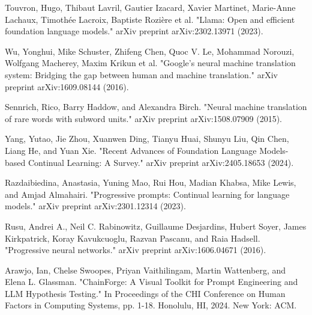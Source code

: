 \documentclass[runningheads]{llncs}
\begin{document}
\begin{thebibliography}{8}
Touvron, Hugo, Thibaut Lavril, Gautier Izacard, Xavier Martinet, Marie-Anne Lachaux, Timothée Lacroix, Baptiste Rozière et al. "Llama: Open and efficient foundation language models." arXiv preprint arXiv:2302.13971 (2023).

Wu, Yonghui, Mike Schuster, Zhifeng Chen, Quoc V. Le, Mohammad Norouzi, Wolfgang Macherey, Maxim Krikun et al. "Google's neural machine translation system: Bridging the gap between human and machine translation." arXiv preprint arXiv:1609.08144 (2016).

Sennrich, Rico, Barry Haddow, and Alexandra Birch. "Neural machine translation of rare words with subword units." arXiv preprint arXiv:1508.07909 (2015).

Yang, Yutao, Jie Zhou, Xuanwen Ding, Tianyu Huai, Shunyu Liu, Qin Chen, Liang He, and Yuan Xie. "Recent Advances of Foundation Language Models-based Continual Learning: A Survey." arXiv preprint arXiv:2405.18653 (2024).

Razdaibiedina, Anastasia, Yuning Mao, Rui Hou, Madian Khabsa, Mike Lewis, and Amjad Almahairi. "Progressive prompts: Continual learning for language models." arXiv preprint arXiv:2301.12314 (2023).


Rusu, Andrei A., Neil C. Rabinowitz, Guillaume Desjardins, Hubert Soyer, James Kirkpatrick, Koray Kavukcuoglu, Razvan Pascanu, and Raia Hadsell. "Progressive neural networks." arXiv preprint arXiv:1606.04671 (2016).

Arawjo, Ian, Chelse Swoopes, Priyan Vaithilingam, Martin Wattenberg, and Elena L. Glassman. "ChainForge: A Visual Toolkit for Prompt Engineering and LLM Hypothesis Testing." In Proceedings of the CHI Conference on Human Factors in Computing Systems, pp. 1-18. Honolulu, HI, 2024. New York: ACM.
\end{thebibliography}
\end{document}
